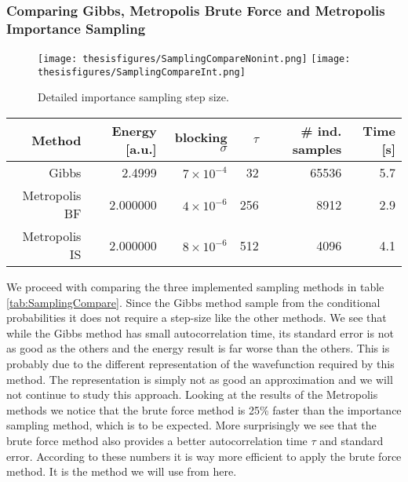 \documentclass[twoside,english]{uiofysmaster}
\newcommand{\ra}[1]{\renewcommand{\arraystretch}{#1}}
\begin{document}
\subsubsection{Comparing Gibbs, Metropolis Brute Force and Metropolis Importance Sampling}


\begin{figure}
\centering
 \texttt{[image: thesisfigures/SamplingCompareNonint.png]}
 \texttt{[image: thesisfigures/SamplingCompareInt.png]}
 \caption{Detailed importance sampling step size.}
 \label{fig:SamplingCompareInt}
\end{figure}



\begin{table*}\centering
\ra{1.3}
\caption{Comparison of autocorrelation time $\tau$ and effective number of independent samples for different step sizes for Gibbs sampling, Metropolis brute force and Metropolis importance sampling, run with $\sim 10^6$ cycles. The system is a non-interacting case of two particles in two dimensions.}
\label{tab:SamplingCompare}
\begin{tabular}{rrrrrr}
\toprule
\toprule
Method & Energy [a.u.]  & blocking $\sigma$  & $\tau$ &  \# ind. samples & Time [s] \\ 
\midrule 
Gibbs         & 2.4999  & $7\times10^{-4}$ &  32 & 65536 & 5.7 \\
Metropolis BF & 2.000000 & $4\times10^{-6}$ & 256 & 8912 & 2.9 \\
Metropolis IS & 2.000000 & $8\times10^{-6}$ & 512 & 4096 & 4.1 \\
\bottomrule
\bottomrule
\end{tabular}
\end{table*}

We proceed with comparing the three implemented sampling methods in table \ref{tab:SamplingCompare}. Since the Gibbs method sample from the conditional probabilities it does not require a step-size like the other methods. We see that while the Gibbs method has small autocorrelation time, its standard error is not as good as the others and the energy result is far worse than the others. This is probably due to the different representation of the wavefunction required by this method. The representation is simply not as good an approximation and we will not continue to study this approach. Looking at the results of the Metropolis methods we notice that the brute force method is 25\% faster than the importance sampling method, which is to be expected. More surprisingly we see that the brute force method also provides a better autocorrelation time $\tau$ and standard error. According to these numbers it is way more efficient to apply the brute force method. It is the method we will use from here.
\end{document}
